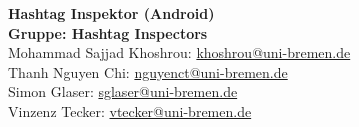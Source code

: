 \documentclass{scrartcl}
\begin{document}
\begin{center}
\sffamily
\huge{\textbf {Hashtag Inspektor (Android)}}\\
\vspace{5pt}
\large{\textbf{Gruppe: Hashtag Inspectors}}\\
\vspace{10pt}
\rmfamily
Mohammad Sajjad Khoshrou: \url{khoshrou@uni-bremen.de} \\
Thanh Nguyen Chi: \url{nguyenct@uni-bremen.de} \\
Simon Glaser: \url{sglaser@uni-bremen.de} \\
Vinzenz Tecker: \url{vtecker@uni-bremen.de} \\
\end{center}
\end{document}
